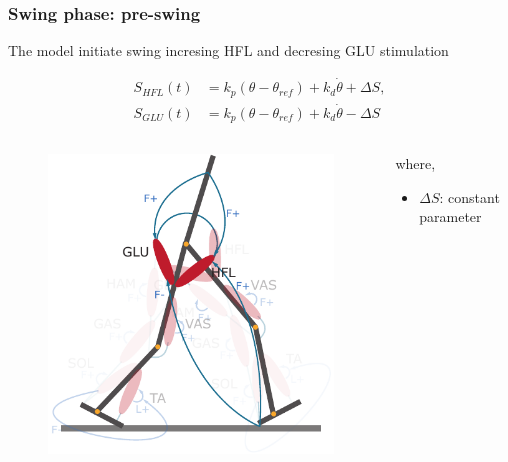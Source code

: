 \documentclass[10pt]{beamer}
\begin{document}
\begin{frame}
	\frametitle{Swing phase: pre-swing}
	The model initiate swing incresing HFL and decresing GLU stimulation
	\begin{block}{}
		\begin{align*}
			S_{HFL}(t)&=  k_p (\theta-\theta_{ref}) + k_d \dot{\theta} + \Delta S,  \\
			S_{GLU}(t)&=  k_p (\theta-\theta_{ref}) + k_d \dot{\theta} - \Delta S
		\end{align*}
	\end{block}
	
	\begin{columns}
		\begin{column}{.5\textwidth}
			\begin{figure}
				\centering
				\includegraphics[width=.5\textheight]{images/new_model/swing/muscle_start_glu.pdf}
			\end{figure}
		\end{column}
		\begin{column}{.5\textwidth}
			where,
			\begin{itemize}
				\item $\Delta S$: constant parameter
			\end{itemize}
		\end{column}
	\end{columns}	
\end{frame}
\end{document}
